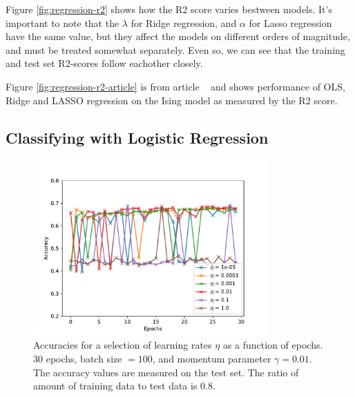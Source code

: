 Figure \ref{fig:regression-r2} shows how the R2 score varies bestween models. 
It's important to note that the $\lambda$ for Ridge regression, and $\alpha$ 
for Lasso regression have the same value, but they affect the models on 
different orders of magnitude, and must be treated somewhat separately. 
Even so, we can see that the training and test set R2-scores
follow eachother closely.

Figure \ref{fig:regression-r2-article} is from article ~\cite{HighBias} and 
shows performance of OLS, Ridge and LASSO regression
on the Ising model as measured by the R2 score.
\subsection{Classifying with Logistic Regression}

\begin{figure}[H]
    \centering
\includegraphics[width = 0.8\textwidth]{figures/logistic_eta.pdf}
    \caption{Accuracies for a selection of learning rates $\eta$ as a function of epochs. 
    30 epochs, batch size $= 100$, and momentum parameter $\gamma = 0.01$. The accuracy
    values are measured on the test set.
    The ratio of amount of training data to test data is $0.8$.}
\label{fig:logistic-eta}
\end{figure}

